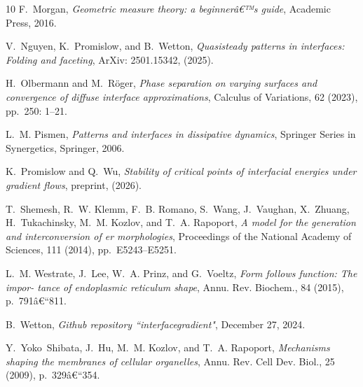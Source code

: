 \documentclass[11pt]{amsart}
\theoremstyle{plain}
\numberwithin{equation}{section}
\theoremstyle{plain}
\begin{document}
\begin{thebibliography}{10}
{\sc F.~Morgan}, {\em Geometric measure theory: a beginnerâ€™s guide}, Academic Press, 2016.

{\sc V.~Nguyen, K.~Promislow, and B.~Wetton}, {\em Quasisteady patterns in interfaces: Folding and faceting}, ArXiv: 2501.15342,  (2025).

{\sc H.~Olbermann and M.~R\"oger}, {\em Phase separation on varying surfaces and convergence of diffuse interface approximations}, Calculus of Variations, 62 (2023), pp.~250: 1--21.

{\sc L.~M. Pismen}, {\em Patterns and interfaces in dissipative dynamics}, Springer Series in Synergetics, Springer, 2006.

{\sc K.~Promislow and Q.~Wu}, {\em Stability of critical points of interfacial energies under gradient flows}, preprint,  (2026).

{\sc T.~Shemesh, R.~W. Klemm, F.~B. Romano, S.~Wang, J.~Vaughan, X.~Zhuang, H.~Tukachinsky, M.~M. Kozlov, and T.~A. Rapoport}, {\em A model for the generation and interconversion of er morphologies}, Proceedings of the National Academy of Sciences, 111 (2014), pp.~E5243--E5251.

{\sc L.~M. Westrate, J.~Lee, W.~A. Prinz, and G.~Voeltz}, {\em Form follows function: The impor- tance of endoplasmic reticulum shape}, Annu. Rev. Biochem., 84 (2015), p.~791â€“811.

{\sc B.~Wetton}, {\em Github repository ``interfacegradient"}, December 27, 2024.

{\sc Y.~Yoko~Shibata, J.~Hu, M.~M. Kozlov, and T.~A. Rapoport}, {\em Mechanisms shaping the membranes of cellular organelles}, Annu. Rev. Cell Dev. Biol., 25 (2009), p.~329â€“354.

\end{thebibliography}
\end{document}
